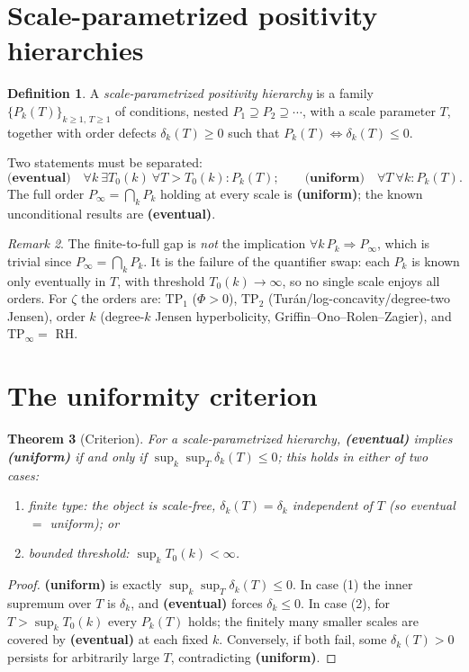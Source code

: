 \documentclass[11pt]{amsart}
\newtheorem{theorem}{Theorem}[section]
\theoremstyle{definition}
\newtheorem{definition}[theorem]{Definition}
\theoremstyle{remark}
\newtheorem{remark}[theorem]{Remark}
\newcommand{\TP}{\mathrm{TP}}
\begin{document}
\section{Scale-parametrized positivity hierarchies}
\begin{definition}
A \emph{scale-parametrized positivity hierarchy} is a family
$\{P_k(T)\}_{k\ge1,\,T\ge1}$ of conditions, nested $P_1\supseteq P_2\supseteq
\cdots$, with a scale parameter $T$, together with order defects
$\delta_k(T)\ge0$ such that $P_k(T)\iff\delta_k(T)\le0$.
\end{definition}
Two statements must be separated:
\[
\textbf{(eventual)}\quad\forall k\ \exists T_0(k)\ \forall T>T_0(k):P_k(T);
\qquad
\textbf{(uniform)}\quad\forall T\ \forall k:P_k(T).
\]
The full order $P_\infty=\bigcap_k P_k$ holding at every scale is \textbf{(uniform)};
the known unconditional results are \textbf{(eventual)}.

\begin{remark}
The finite-to-full gap is \emph{not} the implication $\forall k\,P_k\Rightarrow
P_\infty$, which is trivial since $P_\infty=\bigcap_kP_k$. It is the failure of
the quantifier swap: each $P_k$ is known only eventually in $T$, with threshold
$T_0(k)\to\infty$, so no single scale enjoys all orders. For $\zeta$ the orders
are: $\TP_1$ ($\Phi>0$), $\TP_2$ (Tur\'an/log-concavity/degree-two Jensen),
order $k$ (degree-$k$ Jensen hyperbolicity, Griffin--Ono--Rolen--Zagier), and
$\TP_\infty=$ RH.
\end{remark}

\section{The uniformity criterion}
\begin{theorem}[Criterion]\label{thm:crit}
For a scale-parametrized hierarchy, \textbf{(eventual)} implies
\textbf{(uniform)} if and only if $\sup_k\sup_T\delta_k(T)\le0$; this holds in
either of two cases:
\begin{enumerate}
\item \emph{finite type:} the object is scale-free, $\delta_k(T)=\delta_k$
independent of $T$ (so eventual $=$ uniform); or
\item \emph{bounded threshold:} $\sup_kT_0(k)<\infty$.
\end{enumerate}
\end{theorem}
\begin{proof}
\textbf{(uniform)} is exactly $\sup_k\sup_T\delta_k(T)\le0$. In case (1) the
inner supremum over $T$ is $\delta_k$, and \textbf{(eventual)} forces
$\delta_k\le0$. In case (2), for $T>\sup_kT_0(k)$ every $P_k(T)$ holds; the
finitely many smaller scales are covered by \textbf{(eventual)} at each fixed
$k$. Conversely, if both fail, some $\delta_k(T)>0$ persists for arbitrarily
large $T$, contradicting \textbf{(uniform)}.
\end{proof}
\end{document}
